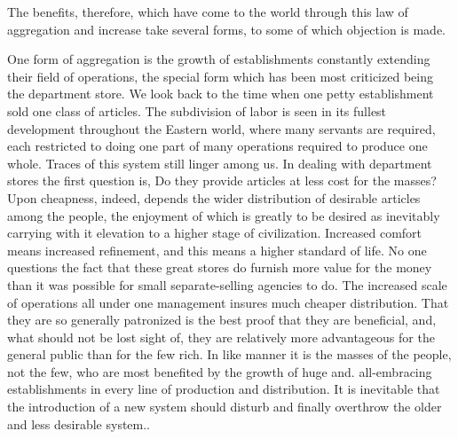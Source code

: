 \documentclass[11pt,openany]{book}
\begin{document}
The benefits, therefore, which have come to the world through this law of aggregation and increase take several forms, to some of which objection is made.

One form of aggregation is the growth of establishments constantly extending their field of operations, the special form which has been most criticized being the department store. We look back to the time when one petty establishment sold one class of articles. The subdivision of labor is seen in its fullest development throughout the Eastern world, where many servants are required, each restricted to doing one part of many operations required to produce one whole. Traces of this system still linger among us. In dealing with department stores the first question is, Do they provide articles at less cost for the masses? Upon cheapness, indeed, depends the wider distribution of desirable articles among the people, the enjoyment of which is greatly to be desired as inevitably carrying with it elevation to a higher stage of civilization. Increased comfort means increased refinement, and this means a higher standard of life. No one questions the fact that these great stores do furnish more value for the money than it was possible for small separate-selling agencies to do. The increased scale of operations all under one management insures much cheaper distribution. That they are so generally patronized is the best proof that they are beneficial, and, what should not be lost sight of, they are relatively more advantageous for the general public than for the few rich. In like manner it is the masses of the people, not the few, who are most benefited by the growth of huge and. all-embracing establishments in every line of production and distribution. It is inevitable that the introduction of a new system should disturb and finally overthrow the older and less desirable system..
\end{document}
